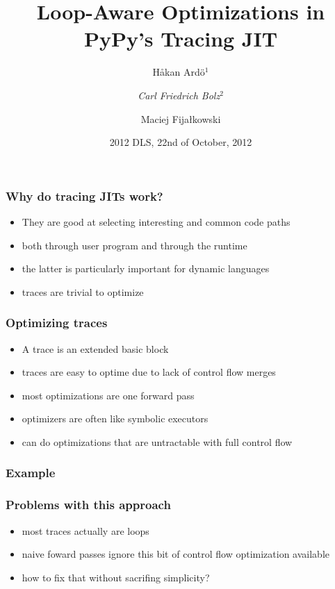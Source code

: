\documentclass[utf8x]{beamer}
\title{Loop-Aware Optimizations in PyPy’s Tracing JIT}
\author[Ardö, Bolz, Fijałkowski]{Håkan Ardö$^1$ \and \emph{Carl Friedrich Bolz}$^2$ \and Maciej Fijałkowski}
\institute[Lund, Düsseldorf]{
$^1$Centre for Mathematical Sciences, Lund University \and
$^2$Heinrich-Heine-Universität Düsseldorf, STUPS Group, Germany
}
\date{2012 DLS, 22nd of October, 2012}
\begin{document}
\begin{frame}
  \titlepage
\end{frame}

\begin{frame}
  \frametitle{Why do tracing JITs work?}
  \begin{itemize}
      \item They are good at selecting interesting and common code paths
      \item both through user program and through the runtime
      \item the latter is particularly important for dynamic languages
          \pause
      \item traces are trivial to optimize
  \end{itemize}
\end{frame}

\begin{frame}
  \frametitle{Optimizing traces}
  \begin{itemize}
      \item A trace is an extended basic block
      \item traces are easy to optime due to lack of control flow merges
      \item most optimizations are one forward pass
      \item optimizers are often like symbolic executors
      \item can do optimizations that are untractable with full control flow
  \end{itemize}
\end{frame}

\begin{frame}
  \frametitle{Example}
\end{frame}


\begin{frame}
  \frametitle{Problems with this approach}
  \begin{itemize}
      \item most traces actually are loops
      \item naive foward passes ignore this bit of control flow optimization available
      \item how to fix that without sacrifing simplicity?
  \end{itemize}
\end{frame}
\end{document}

